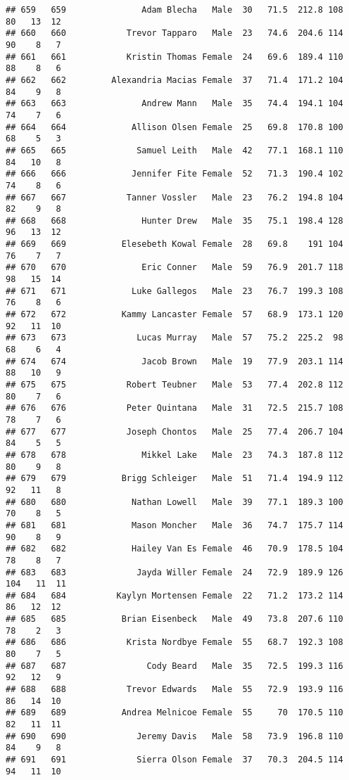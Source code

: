 \documentclass[
]{article}
\begin{document}
\begin{verbatim}
## 659   659               Adam Blecha   Male  30   71.5  212.8 108  80   13  12
## 660   660            Trevor Tapparo   Male  23   74.6  204.6 114  90    8   7
## 661   661            Kristin Thomas Female  24   69.6  189.4 110  88    8   6
## 662   662         Alexandria Macias Female  37   71.4  171.2 104  84    9   8
## 663   663               Andrew Mann   Male  35   74.4  194.1 104  74    7   6
## 664   664             Allison Olsen Female  25   69.8  170.8 100  68    5   3
## 665   665              Samuel Leith   Male  42   77.1  168.1 110  84   10   8
## 666   666             Jennifer Fite Female  52   71.3  190.4 102  74    8   6
## 667   667            Tanner Vossler   Male  23   76.2  194.8 104  82    9   8
## 668   668               Hunter Drew   Male  35   75.1  198.4 128  96   13  12
## 669   669           Elesebeth Kowal Female  28   69.8    191 104  76    7   7
## 670   670               Eric Conner   Male  59   76.9  201.7 118  98   15  14
## 671   671             Luke Gallegos   Male  23   76.7  199.3 108  76    8   6
## 672   672           Kammy Lancaster Female  57   68.9  173.1 120  92   11  10
## 673   673              Lucas Murray   Male  57   75.2  225.2  98  68    6   4
## 674   674               Jacob Brown   Male  19   77.9  203.1 114  88   10   9
## 675   675            Robert Teubner   Male  53   77.4  202.8 112  80    7   6
## 676   676            Peter Quintana   Male  31   72.5  215.7 108  78    7   6
## 677   677            Joseph Chontos   Male  25   77.4  206.7 104  84    5   5
## 678   678               Mikkel Lake   Male  23   74.3  187.8 112  80    9   8
## 679   679           Brigg Schleiger   Male  51   71.4  194.9 112  92   11   8
## 680   680             Nathan Lowell   Male  39   77.1  189.3 100  70    8   5
## 681   681             Mason Moncher   Male  36   74.7  175.7 114  90    8   9
## 682   682             Hailey Van Es Female  46   70.9  178.5 104  78    8   7
## 683   683              Jayda Willer Female  24   72.9  189.9 126 104   11  11
## 684   684          Kaylyn Mortensen Female  22   71.2  173.2 114  86   12  12
## 685   685           Brian Eisenbeck   Male  49   73.8  207.6 110  78    2   3
## 686   686            Krista Nordbye Female  55   68.7  192.3 108  80    7   5
## 687   687                Cody Beard   Male  35   72.5  199.3 116  92   12   9
## 688   688            Trevor Edwards   Male  55   72.9  193.9 116  86   14  10
## 689   689           Andrea Melnicoe Female  55     70  170.5 110  82   11  11
## 690   690              Jeremy Davis   Male  58   73.9  196.8 110  84    9   8
## 691   691              Sierra Olson Female  37   70.3  204.5 114  94   11  10

\end{verbatim}
\end{document}
